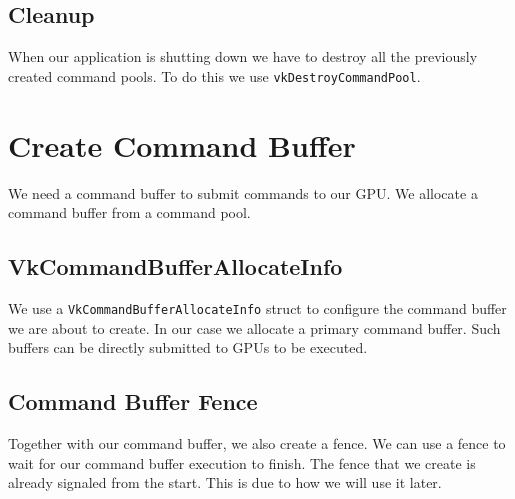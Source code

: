 \subsection{Cleanup}

When our application is shutting down we have to destroy all the previously created
command pools.
To do this we use \texttt{vkDestroyCommandPool}.

\section{Create Command Buffer}

We need a command buffer to submit commands to our GPU.
We allocate a command buffer from a command pool.

\begin{minipage}{\linewidth}{\noindent}
    
\end{minipage}

\subsection{VkCommandBufferAllocateInfo}

We use a \texttt{VkCommandBufferAllocateInfo} struct to configure the command buffer we are
about to create.
In our case we allocate a primary command buffer.
Such buffers can be directly submitted to GPUs to be executed.

\begin{minipage}{\linewidth}{\noindent}
    
\end{minipage}

\subsection{Command Buffer Fence}

Together with our command buffer, we also create a fence.
We can use a fence to wait for our command buffer execution to finish.
The fence that we create is already signaled from the start.
This is due to how we will use it later.

\begin{minipage}{\linewidth}{\noindent}
    
\end{minipage}

